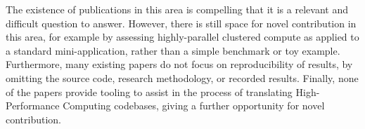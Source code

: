 The existence of publications in this area is compelling that it is a relevant and difficult question to answer. However, there is still space for novel contribution in this area, for example by assessing highly-parallel clustered compute as applied to a standard mini-application, rather than a simple benchmark or toy example. Furthermore, many existing papers do not focus on reproducibility of results, by omitting the source code, research methodology, or recorded results. Finally, none of the papers provide tooling to assist in the process of translating High-Performance Computing codebases, giving a further opportunity for novel contribution.
